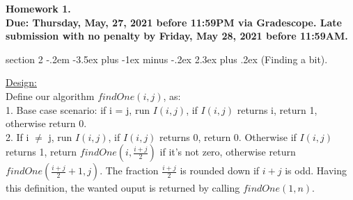 \documentclass{article}
\makeatletter
\newenvironment{problem}{\@startsection
       {section}
       {2}
       {-.2em}
       {-3.5ex plus -1ex minus -.2ex}
       {2.3ex plus .2ex}
       {\pagebreak[3]%
       \large\bf\noindent{Problem }
       }
       }
\makeatother
\begin{document}
{\bf \noindent Homework 1. \\ Due: Thursday, May, 27, 2021 before 11:59PM via Gradescope. Late submission with no penalty by Friday, May 28, 2021 before 11:59AM.}

\begin{problem}{(Finding a bit).}
 
\underline{Design:}\\
Define our algorithm \(findOne(i,j)\), as:\\
1. Base case scenario: if i = j, run \(I(i,j)\), if \(I(i,j)\) returns i, return 1, otherwise return 0.\\
2. If i \(\neq\) j, run \(I(i,j)\), if \(I(i,j)\) returns 0, return 0. Otherwise if \(I(i,j)\) returns 1,
return \(findOne(i,\frac{i+j}{2})\) if it's not zero, otherwise return \(findOne(\frac{i+j}{2} + 1,j)\). The fraction \(\frac{i+j}{2}\) is rounded down if \(i+j\) is odd.
Having this definition, the wanted ouput is returned by calling \(findOne(1,n)\).
\\ \hspace*{\fill} \\


\end{problem}
\end{document}
